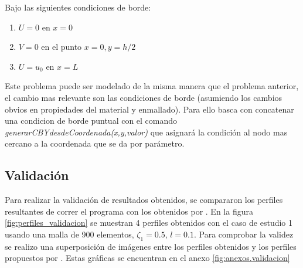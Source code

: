 \begin{enumerate}
		Bajo las siguientes condiciones de borde:
		\begin{enumerate}
			\item[] $U = 0$ en $x=0$
			\item[] $V = 0$ en el punto $x=0,y=h/2$
			\item[] $U = u_0$ en $x=L$
		\end{enumerate}

		Este problema puede ser modelado de la misma manera que el problema anterior, el cambio mas relevante son las condiciones de borde (asumiendo los cambios obvios en propiedades del material y enmallado). Para ello basca con concatenar una condicion de borde puntual con el comando \textit{generarCBYdesdeCoordenada(x,y,valor)} que asignará la condición al nodo mas cercano a la coordenada que se da por parámetro.

	\end{enumerate}
	\subsection{Validación}
	\label{sub:validacion}

	Para realizar la validación de resultados obtenidos, se compararon los perfiles resultantes de correr el programa con los obtenidos por \textcite{Pisano2009}. En la figura \ref{fig:perfiles_validacion} se muestran 4 perfiles obtenidos con el caso de estudio 1 usando una malla de 900 elementos, $\zeta_1=0.5$, $l=0.1$. Para comprobar la validez se realizo una superposición de imágenes entre los perfiles obtenidos y los perfiles propuestos por \textcite{Pisano2009}. Estas gráficas se encuentran en el anexo \ref{fig:anexos.validacion}

